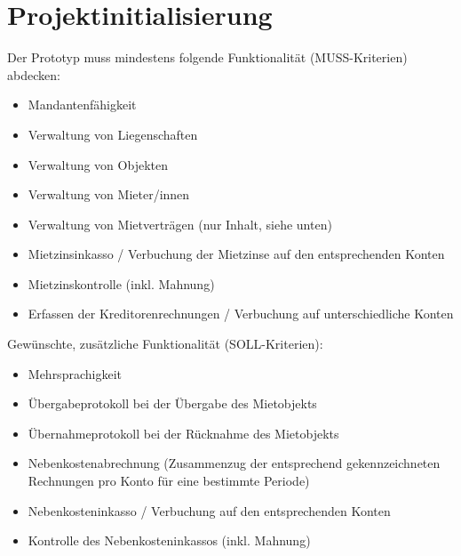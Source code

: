 \section{Projektinitialisierung}


\newpage
Der Prototyp muss mindestens folgende Funktionalität (MUSS-Kriterien) abdecken:
\begin{itemize} \label{musskrit}
  \item Mandantenfähigkeit
  \item Verwaltung von Liegenschaften
  \item Verwaltung von Objekten
  \item Verwaltung von Mieter/innen
  \item Verwaltung von Mietverträgen (nur Inhalt, siehe unten)
  \item Mietzinsinkasso / Verbuchung der Mietzinse auf den entsprechenden Konten
  \item Mietzinskontrolle (inkl. Mahnung)
  \item Erfassen der Kreditorenrechnungen / Verbuchung auf unterschiedliche Konten
\end{itemize}

\vspace{3mm}
Gewünschte, zusätzliche Funktionalität (SOLL-Kriterien):
\begin{itemize}
  \item Mehrsprachigkeit
  \item Übergabeprotokoll bei der Übergabe des Mietobjekts
  \item Übernahmeprotokoll bei der Rücknahme des Mietobjekts
  \item Nebenkostenabrechnung (Zusammenzug der entsprechend gekennzeichneten Rechnungen pro Konto für eine bestimmte Periode)
  \item Nebenkosteninkasso / Verbuchung auf den entsprechenden Konten
  \item Kontrolle des Nebenkosteninkassos (inkl. Mahnung)
\end{itemize}

